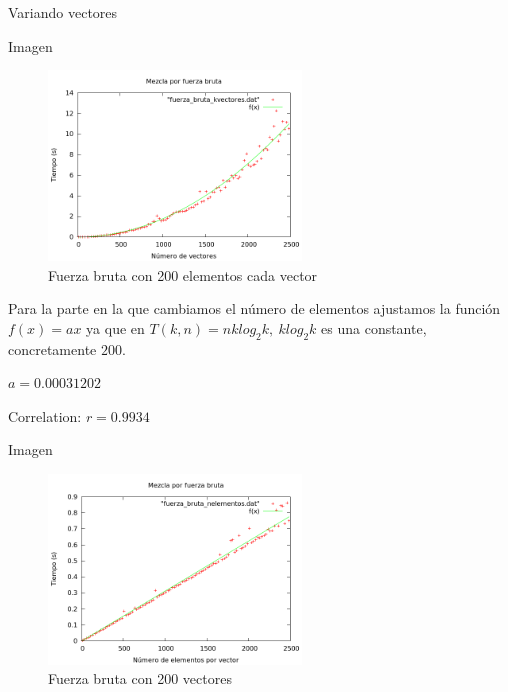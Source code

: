 \begin{frame}{Variando vectores}
	\begin{exampleblock}{Imagen}
	\begin{figure}[htb] 
	\centering
	\includegraphics[width=0.6\textwidth]														{../Obligatorio/Graficas/fuerza_bruta_kvectores.png}
	\caption{Fuerza bruta con 200 elementos cada vector} 
	\label{fig:f_kvectores} 
	\end{figure}
	\end{exampleblock}
\end{frame}

\begin{frame}
	\begin{block}
	Para la parte en la que cambiamos el n\'umero de elementos ajustamos la funci\'on 
	$f(x) = ax$ ya 	que en $T(k, n) = nklog_2k, \ klog_2k$ es una constante, concretamente 	$200$.

	\begin{center}
	$a               = 0.00031202$

	Correlation:  $r = 0.9934$
	\end{center}
	\end{block}
\end{frame}

\begin{frame}{Imagen}
	\begin{exampleblock}
	
	\begin{figure}[h] 
	\includegraphics[width=0.6\textwidth]
	{../Obligatorio/Graficas/fuerza_bruta_nelementos.png}
	\caption{Fuerza bruta con 200 vectores} 
	\end{figure}
	
	\end{exampleblock}
\end{frame}

